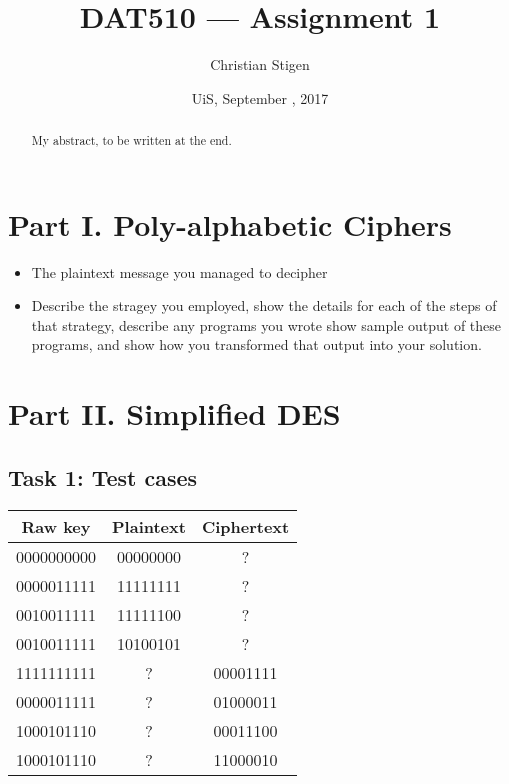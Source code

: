 \documentclass[a4paper,english,12pt]{article}
\title{DAT510 --- Assignment 1}
\author{Christian Stigen}
\date{UiS, September \nth{18}, 2017}
\begin{document}
\maketitle

\begin{abstract}
My abstract, to be written at the end.
\end{abstract}

\section{Part I. Poly-alphabetic Ciphers}

\begin{itemize}
  \item The plaintext message you managed to decipher
  \item Describe the stragey you employed, show the details for each of the
    steps of that strategy, describe any programs you wrote show sample output
    of these programs, and show how you transformed that output into your
    solution.
\end{itemize}

\section{Part II. Simplified DES}

\subsection{Task 1: Test cases}

\begin{table}[H]
  \centering
  \begin{tabular}{ccc}
    \hline \textbf{Raw key} &
           \textbf{Plaintext} &
           \textbf{Ciphertext} \\
    \hline
    0000000000 & 00000000 & ? \\
    0000011111 & 11111111 & ? \\
    0010011111 & 11111100 & ? \\
    0010011111 & 10100101 & ? \\
    1111111111 & ? & 00001111 \\
    0000011111 & ? & 01000011 \\
    1000101110 & ? & 00011100 \\
    1000101110 & ? & 11000010 \\
    \hline
  \end{tabular}
  \label{table:task1}
\end{table}
\end{document}
